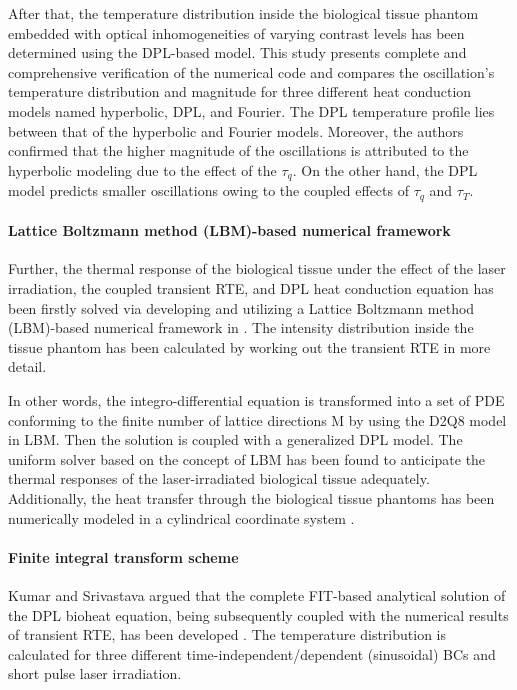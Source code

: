 \documentclass[sn-mathphys]{sn-jnl}%
\theoremstyle{thmstyleone}%
\theoremstyle{thmstyletwo}%
\theoremstyle{thmstylethree}%
\begin{document}
After that, the temperature distribution inside the biological tissue phantom embedded with optical inhomogeneities of varying contrast levels has been determined using the DPL-based model. This study presents complete and comprehensive verification of the numerical code and compares the oscillation's temperature distribution and magnitude for three different heat conduction models named hyperbolic, DPL, and Fourier. The DPL temperature profile lies between that of the hyperbolic and Fourier models. Moreover, the authors confirmed that the higher magnitude of the oscillations is attributed to the hyperbolic modeling due to the effect of the $\tau_q$. On the other hand, the DPL model predicts smaller oscillations owing to the coupled effects of $\tau_q$ and $\tau_T$.
\paragraph{Lattice Boltzmann method (LBM)-based numerical framework}
Further, the thermal response of the biological tissue under the effect of the laser irradiation, the coupled transient RTE, and DPL heat conduction equation has been firstly solved via developing and utilizing a Lattice Boltzmann method (LBM)-based numerical framework in \cite{SPatidar2016}. The intensity distribution inside the tissue phantom has been calculated by working out the transient RTE in more detail.

In other words, the integro-differential equation is transformed into a set of PDE conforming to the finite number of lattice directions M by using the D2Q8 model in LBM. Then the solution is coupled with a generalized DPL model. The uniform solver based on the concept of LBM has been found to anticipate the thermal responses of the laser-irradiated biological tissue adequately. Additionally, the heat transfer through the biological tissue phantoms has been numerically modeled in a cylindrical coordinate system \cite{Sravan2018}.

\paragraph{Finite integral transform scheme}
Kumar and Srivastava argued that the complete FIT-based analytical solution of the DPL bioheat equation, being subsequently coupled with the numerical results of transient RTE, has been developed \cite{Kumar20171}. The temperature distribution is calculated for three different time-independent/dependent (sinusoidal) BCs and short pulse laser irradiation.
\end{document}

